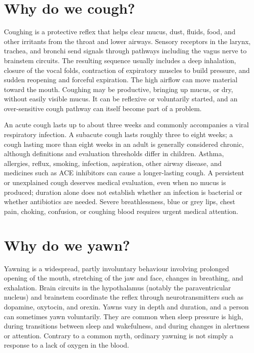 \documentclass[11pt,oneside]{report}
\begin{document}
\section{Why do we cough?}

Coughing is a protective reflex that helps clear mucus, dust, fluids, food, and
other irritants from the throat and lower airways. Sensory receptors in the
larynx, trachea, and bronchi send signals through pathways including the vagus
nerve to brainstem circuits. The resulting sequence usually includes a deep
inhalation, closure of the vocal folds, contraction of expiratory muscles to
build pressure, and sudden reopening and forceful expiration. The high airflow
can move material toward the mouth. Coughing may be productive, bringing up
mucus, or dry, without easily visible mucus. It can be reflexive or voluntarily
started, and an over-sensitive cough pathway can itself become part of a
problem.

An acute cough lasts up to about three weeks and commonly accompanies a viral
respiratory infection. A subacute cough lasts roughly three to eight weeks; a
cough lasting more than eight weeks in an adult is generally considered chronic,
although definitions and evaluation thresholds differ in children. Asthma,
allergies, reflux, smoking, infection, aspiration, other airway disease, and
medicines such as ACE inhibitors can cause a longer-lasting cough. A persistent
or unexplained cough deserves medical evaluation, even when no mucus is
produced; duration alone does not establish whether an infection is bacterial
or whether antibiotics are needed. Severe breathlessness, blue or grey lips,
chest pain, choking, confusion, or coughing blood requires urgent medical
attention.

\section{Why do we yawn?}

Yawning is a widespread, partly involuntary behaviour involving prolonged
opening of the mouth, stretching of the jaw and face, changes in breathing, and
exhalation. Brain circuits in the hypothalamus (notably the paraventricular
nucleus) and brainstem coordinate the reflex through neurotransmitters such as
dopamine, oxytocin, and orexin. Yawns vary in depth and duration, and a person
can sometimes yawn voluntarily. They are common when sleep pressure is high,
during transitions between sleep and wakefulness, and during changes in
alertness or attention. Contrary to a common myth, ordinary yawning is not
simply a response to a lack of oxygen in the blood.
\end{document}
